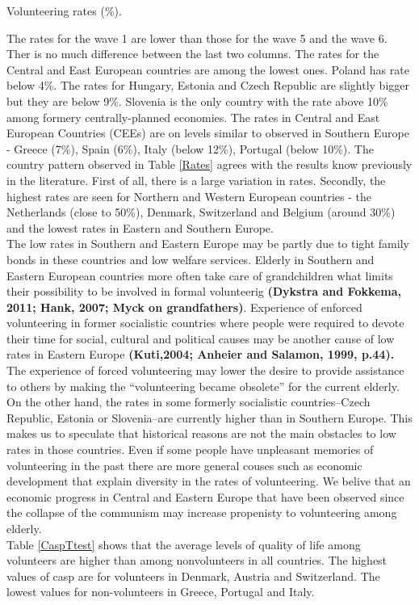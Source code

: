 \documentclass[10pt, letterpaper]{article}
\begin{document}
\begin{spacing}{1.4}
\begin{spacing}{.9}
\begin{table}[H]
\centering 
\caption{Volunteering rates (\%).} 
\begin{small} 
	 
      \label{Rates} 
\end{small}
\end{table}
\end{spacing}

The rates for the wave 1 are lower than those for the wave 5 and the wave 6. Ther is no much difference between the last two columns.  The rates for  the Central and East European countries are among the lowest ones.  Poland has rate below 4\%. The rates for Hungary, Estonia and Czech Republic are slightly bigger but they are below 9\%. Slovenia is the only country with the rate above 10\% among formery centrally-planned economies. The rates in Central and East European Countries (CEEs) are on levels similar to observed in Southern Europe - Greece (7\%), Spain (6\%), Italy (below 12\%), Portugal (below 10\%).  The country pattern observed in Table \ref{Rates} agrees with the results know previously in the literature. First of all, there is a large variation in rates. Secondly,  the highest rates are seen for  Northern and Western European countries - the Netherlands (close to 50\%), Denmark, Switzerland and Belgium (around 30\%) and the lowest rates in Eastern and Southern Europe. \\
The low rates in Southern and Eastern Europe may be partly due to tight family bonds in these countries and low welfare services. Elderly in Southern and Eastern European countries more often take care of grandchildren what limits their possibility to be involved in formal volunteerig \textbf{(Dykstra and Fokkema, 2011; Hank, 2007; Myck on grandfathers)}. Experience of  enforced volunteering  in former socialistic countries where people were required to devote their time for social, cultural and political causes may be another cause of low rates in Eastern Europe \textbf{(Kuti,2004; Anheier and Salamon, 1999, p.44).} The experience of forced volunteering  may lower the desire to provide assistance to others by making the “volunteering became obsolete” for the current elderly. On the other hand, the rates in some formerly socialistic countries--Czech Republic, Estonia or Slovenia--are currently higher than in Southern Europe. This makes us to speculate that historical reasons are not the main obstacles to low rates in those countries. Even if some people have unpleasant memories of volunteering in the past there are more general couses such as economic development that explain diversity in the rates of volunteering. We belive that an economic progress in Central and Eastern Europe that have been observed since the collapse of the communism may increase propenisty to volunteering among elderly. \\
Table \ref{CaspTtest} shows that the average levels of quality of life among volunteers are higher than among nonvolunteers in all countries. The highest values of casp are for volunteers in Denmark, Austria and Switzerland. The lowest values for non-volunteers in Greece, Portugal and Italy.



\end{spacing}
\end{document}
